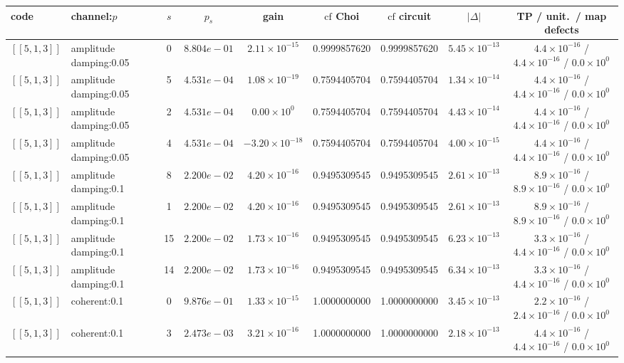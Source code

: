\documentclass[10pt,a4paper]{article}
\begin{document}
\begin{longtable}{llccccccc}
\toprule code & channel:$p$ & $s$ & $p_s$ & gain & $\mathrm{cf}$ Choi & $\mathrm{cf}$ circuit & $|\Delta|$ & TP / unit.\ / map defects \\ \midrule
$[\![5,1,3]\!]$ & amplitude damping:0.05 & 0 & $8.804e-01$ & $2.11\times 10^{-15}$ & 0.9999857620 & 0.9999857620 & $5.45\times 10^{-13}$ & $4.4\times 10^{-16}$ / $4.4\times 10^{-16}$ / $0.0\times 10^{0}$ \\
$[\![5,1,3]\!]$ & amplitude damping:0.05 & 5 & $4.531e-04$ & $1.08\times 10^{-19}$ & 0.7594405704 & 0.7594405704 & $1.34\times 10^{-14}$ & $4.4\times 10^{-16}$ / $4.4\times 10^{-16}$ / $0.0\times 10^{0}$ \\
$[\![5,1,3]\!]$ & amplitude damping:0.05 & 2 & $4.531e-04$ & $0.00\times 10^{0}$ & 0.7594405704 & 0.7594405704 & $4.43\times 10^{-14}$ & $4.4\times 10^{-16}$ / $4.4\times 10^{-16}$ / $0.0\times 10^{0}$ \\
$[\![5,1,3]\!]$ & amplitude damping:0.05 & 4 & $4.531e-04$ & $-3.20\times 10^{-18}$ & 0.7594405704 & 0.7594405704 & $4.00\times 10^{-15}$ & $4.4\times 10^{-16}$ / $4.4\times 10^{-16}$ / $0.0\times 10^{0}$ \\
$[\![5,1,3]\!]$ & amplitude damping:0.1 & 8 & $2.200e-02$ & $4.20\times 10^{-16}$ & 0.9495309545 & 0.9495309545 & $2.61\times 10^{-13}$ & $8.9\times 10^{-16}$ / $8.9\times 10^{-16}$ / $0.0\times 10^{0}$ \\
$[\![5,1,3]\!]$ & amplitude damping:0.1 & 1 & $2.200e-02$ & $4.20\times 10^{-16}$ & 0.9495309545 & 0.9495309545 & $2.61\times 10^{-13}$ & $8.9\times 10^{-16}$ / $8.9\times 10^{-16}$ / $0.0\times 10^{0}$ \\
$[\![5,1,3]\!]$ & amplitude damping:0.1 & 15 & $2.200e-02$ & $1.73\times 10^{-16}$ & 0.9495309545 & 0.9495309545 & $6.23\times 10^{-13}$ & $3.3\times 10^{-16}$ / $4.4\times 10^{-16}$ / $0.0\times 10^{0}$ \\
$[\![5,1,3]\!]$ & amplitude damping:0.1 & 14 & $2.200e-02$ & $1.73\times 10^{-16}$ & 0.9495309545 & 0.9495309545 & $6.34\times 10^{-13}$ & $3.3\times 10^{-16}$ / $4.4\times 10^{-16}$ / $0.0\times 10^{0}$ \\
$[\![5,1,3]\!]$ & coherent:0.1 & 0 & $9.876e-01$ & $1.33\times 10^{-15}$ & 1.0000000000 & 1.0000000000 & $3.45\times 10^{-13}$ & $2.2\times 10^{-16}$ / $2.4\times 10^{-16}$ / $0.0\times 10^{0}$ \\
$[\![5,1,3]\!]$ & coherent:0.1 & 3 & $2.473e-03$ & $3.21\times 10^{-16}$ & 1.0000000000 & 1.0000000000 & $2.18\times 10^{-13}$ & $4.4\times 10^{-16}$ / $4.4\times 10^{-16}$ / $0.0\times 10^{0}$ \\

\end{longtable}
\end{document}
